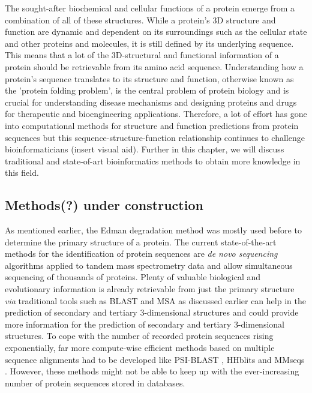 The sought-after biochemical and cellular functions of a protein emerge from a combination of all of these structures. While a protein's 3D structure and function are dynamic and dependent on its surroundings such as the cellular state and other proteins and molecules, it is still defined by its underlying sequence. This means that a lot of the 3D-structural and functional information of a protein should be retrievable from its amino acid sequence\cite{structure}. Understanding how a protein's sequence translates to its structure and function, otherwise known as the 'protein folding problem', is the central problem of protein biology and is crucial for understanding disease mechanisms and designing proteins and drugs for therapeutic and bioengineering applications. Therefore, a lot of effort has gone into computational methods for structure and function predictions from protein sequences but this sequence-structure-function relationship continues to challenge bioinformaticians (insert visual aid). Further in this chapter, we will discuss traditional and state-of-art bioinformatics methods to obtain more knowledge in this field.

\subsection{Methods(?) under construction}
As mentioned earlier, the Edman degradation method was mostly used before to determine the primary structure of a protein. The current state-of-the-art methods for the identification of protein sequences are \textit{de novo sequencing} algorithms applied to tandem mass spectrometry data\cite{protseq} and allow simultaneous sequencing of thousands of proteins. Plenty of valuable biological and evolutionary information is already retrievable from just the primary structure \textit{via} traditional tools such as BLAST and MSA as discussed earlier can help in the prediction of secondary and tertiary 3-dimensional structures and could provide more information for the prediction of secondary and tertiary 3-dimensional structures. To cope with the number of recorded protein sequences rising exponentially, far more compute-wise efficient methods based on multiple sequence alignments had to be developed like PSI-BLAST \cite{psiblast}, HHblits \cite{hhblits3} and MMseqs \cite{mmseqs2}. However, these methods might not be able to keep up with the ever-increasing number of protein sequences stored in databases.

